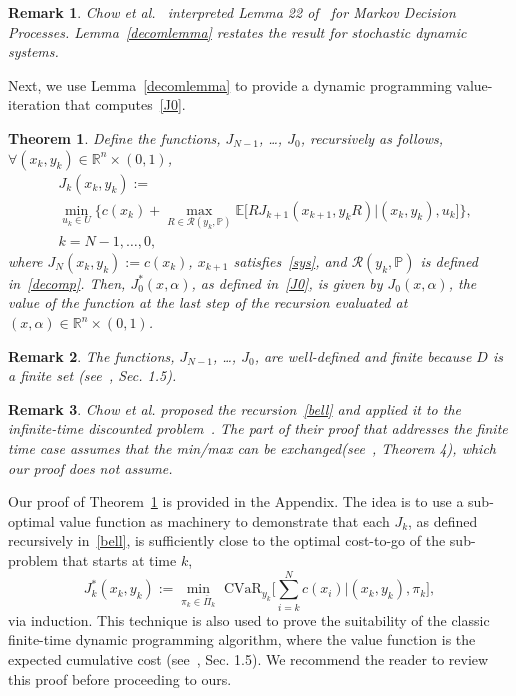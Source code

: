 \documentclass[letterpaper, 10 pt, conference]{ieeeconf}  %
\newtheorem{theorem}{Theorem}
\newtheorem{remark}{Remark}
\begin{document}
\begin{remark}
Chow et al.~\cite{chow2015risk} interpreted Lemma 22 of~\cite{pflug2016time} for Markov Decision Processes.
Lemma~\ref{decomlemma} restates the result for stochastic dynamic systems.
\end{remark}

Next, we use Lemma~\ref{decomlemma} to provide a dynamic programming value-iteration that computes~\eqref{J0}.
\begin{theorem}\label{thm}
Define the functions, $J_{N-1}$, \dots, $J_0$, recursively as follows, $\forall (x_k, y_k) \in \mathbb{R}^n \times (0,1)$,
\begin{equation}\begin{aligned}
& J_k(x_k,y_k) := \\
& {\underset{u_k \in U}\min} \Bigg\{ c(x_k) + {\underset{R \in \mathcal{R}(y_k, \mathbb{P})}\max} \mathbb{E}\Big[ R J_{k+1}(x_{k+1}, y_k R) \Big| (x_k, y_k), u_k \Big] \Bigg\}, \\
& k = N-1, \dots, 0,
\end{aligned}\label{bell}\end{equation}
where $J_N(x_k, y_k) := c(x_k)$, $x_{k+1}$ satisfies~\eqref{sys}, and $\mathcal{R}(y_k, \mathbb{P})$ is defined in~\eqref{decomp}.  
Then, $J_0^*(x,\alpha)$, as defined in~\eqref{J0}, is given by $J_0(x, \alpha)$, 
the value of the function at the last step of the recursion evaluated at $(x,\alpha) \in \mathbb{R}^n \times (0,1)$.
\end{theorem}
\begin{remark}
The functions, $J_{N-1}$, \dots, $J_0$, are well-defined and finite because $D$ is a finite set (see~\cite{bertsekas2005dynamic}, Sec. 1.5).
\end{remark}
\begin{remark}
Chow et al. proposed the recursion~\eqref{bell} and applied it to the infinite-time discounted problem~\cite{chow2015risk}. 
The part of their proof that addresses the finite time case assumes that the min/max can be exchanged(see~\cite{chow2015risk}, Theorem 4),
which our proof does not assume. 
\end{remark}

Our proof of Theorem~\ref{thm} is provided in the Appendix.
The idea is to use a sub-optimal value function as machinery to demonstrate that each $J_k$, as defined recursively in~\eqref{bell},
is sufficiently close to the optimal cost-to-go of the sub-problem that starts at time $k$,
\begin{equation}
J_k^*(x_k, y_k) := {\underset{\pi_k \in \bar{\Pi}_k}\min} \text{ CVaR}_{y_k} \Big[ \textstyle\sum_{i=k}^N c(x_i) \Big| (x_k, y_k), \pi_k \Big],
\end{equation}
via induction. This technique is also used to prove the suitability of the classic finite-time dynamic programming algorithm, 
where the value function is the expected cumulative cost (see~\cite{bertsekas2005dynamic}, Sec. 1.5).
We recommend the reader to review this proof before proceeding to ours. 
\end{document}
